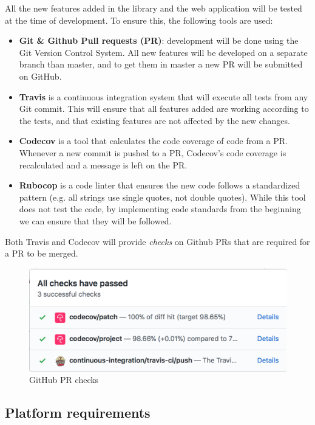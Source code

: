 All the new features added in the library and the web application will be tested at the time of development. To ensure this, the following tools are used:
\begin{itemize}
  \item \textbf{Git \& Github Pull requests (PR)}: development will be done using the Git Version Control System. All new features will be developed on a separate branch than master, and to get them in master a new PR will be submitted on GitHub.
  \item \textbf{Travis} is a continuous integration system that will execute all tests from any Git commit. This will ensure that all features added are working according to the tests, and that existing features are not affected by the new changes.
  \item \textbf{Codecov} is a tool that calculates the code coverage of code from a PR. Whenever a new commit is pushed to a PR, Codecov's code coverage is recalculated and a message is left on the PR.
  \item \textbf{Rubocop} is a code linter that ensures the new code follows a standardized pattern (e.g. all strings use single quotes, not double quotes). While this tool does not test the code, by implementing code standards from the beginning we can ensure that they will be followed.
\end{itemize}

Both Travis and Codecov will provide \textit{checks} on Github PRs that are required for a PR to be merged.

\begin{figure}[htp]
    \centering
    \includegraphics[width=(\linewidth / 3 * 2)]{Chapters/3-RequirementAndSpecifications/github_checks.png}
    \caption{GitHub PR checks}
    \label{fig:github_pr}
\end{figure}

\subsection{Platform requirements}

